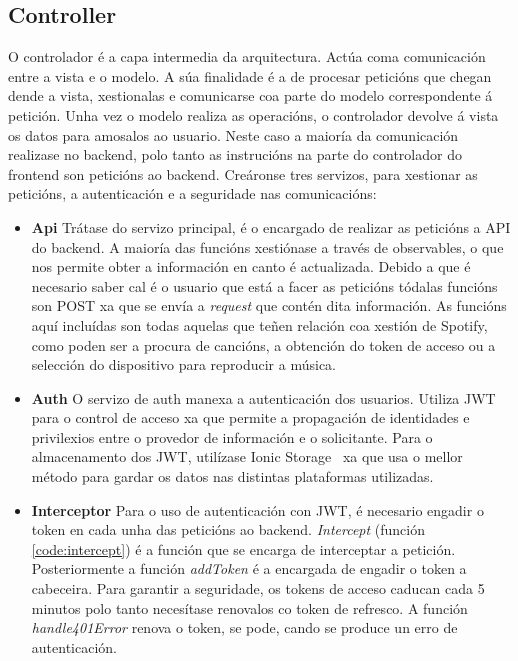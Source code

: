 \subsection{Controller}
O controlador é a capa intermedia da arquitectura. Actúa coma comunicación entre a vista e o modelo. A súa finalidade é a de procesar peticións que chegan dende a vista, xestionalas e comunicarse coa parte do modelo correspondente á petición. Unha vez o modelo realiza as operacións, o controlador devolve á vista os datos para amosalos ao usuario. Neste caso a maioría da comunicación realizase no backend, polo tanto as instrucións na parte do controlador do frontend son peticións ao backend. Creáronse tres servizos, para xestionar as peticións, a autenticación e a seguridade nas comunicacións:
\begin{itemize}
	\item \textbf{Api}\smallbreak
		Trátase do servizo principal, é o encargado de realizar as peticións a \gls{API} do backend. A maioría das funcións xestiónase a través de observables, o que nos permite obter a información en canto é actualizada. Debido a que é necesario saber cal é o usuario que está a facer as peticións tódalas funcións son POST xa que se envía a \textit{request} que contén dita información. As funcións aquí incluídas son todas aquelas que teñen relación coa xestión de Spotify, como poden ser a procura de cancións, a obtención do token de acceso ou a selección do dispositivo para reproducir a música.

	\item \textbf{Auth}\smallbreak
		O servizo de auth manexa a autenticación dos usuarios. Utiliza \acrlong{JWT} para o control de acceso xa que permite a propagación de identidades e privilexios entre o provedor de información e o solicitante. Para o almacenamento dos \acrshort{JWT}, utilízase Ionic Storage~\cite{ionicStorage} xa que usa o mellor método para gardar os datos nas distintas plataformas utilizadas.

	\item \textbf{Interceptor}\smallbreak
		Para o uso de autenticación con \acrshort{JWT}, é necesario engadir o token en cada unha das peticións ao backend. \textit{Intercept} (función \ref{code:intercept}) é a función que se encarga de interceptar a petición. Posteriormente a función \textit{addToken} é a encargada de engadir o token a cabeceira. Para garantir a seguridade, os tokens de acceso caducan cada 5 minutos polo tanto necesítase renovalos co token de refresco. A función \textit{handle401Error} renova o token, se pode, cando se produce un erro de autenticación.

\end{itemize}

